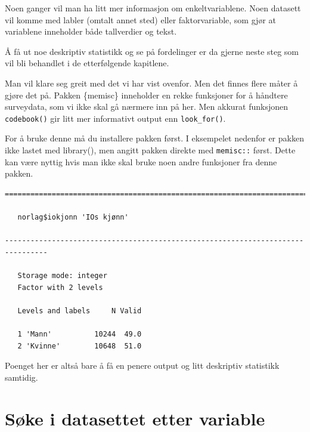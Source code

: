 \documentclass[
  letterpaper,
  DIV=11,
  numbers=noendperiod]{scrreprt}
\newenvironment{Shaded}{\begin{snugshade}}{\end{snugshade}}
\newcommand{\FunctionTok}[1]{\textcolor[rgb]{0.28,0.35,0.67}{#1}}
\newcommand{\NormalTok}[1]{\textcolor[rgb]{0.00,0.23,0.31}{#1}}
\newcommand{\SpecialCharTok}[1]{\textcolor[rgb]{0.37,0.37,0.37}{#1}}
\theoremstyle{definition}
\theoremstyle{remark}
\begin{document}
Noen ganger vil man ha litt mer informasjon om enkeltvariablene. Noen
datasett vil komme med labler (omtalt annet sted) eller faktorvariable,
som gjør at variablene inneholder både tallverdier og tekst.

Å få ut noe deskriptiv statistikk og se på fordelinger er da gjerne
neste steg som vil bli behandlet i de etterfølgende kapitlene.

Man vil klare seg greit med det vi har vist ovenfor. Men det finnes
flere måter å gjøre det på. Pakken \{memisc\} inneholder en rekke
funksjoner for å håndtere surveydata, som vi ikke skal gå nærmere inn på
her. Men akkurat funksjonen \texttt{codebook()} gir litt mer informativt
output enn \texttt{look\_for()}.

For å bruke denne må du installere pakken først. I eksempelet nedenfor
er pakken ikke lastet med library(), men angitt pakken direkte med
\texttt{memisc::} først. Dette kan være nyttig hvis man ikke skal bruke
noen andre funksjoner fra denne pakken.

\begin{Shaded}
\end{Shaded}

\begin{verbatim}
================================================================================

   norlag$iokjonn 'IOs kjønn'

--------------------------------------------------------------------------------

   Storage mode: integer
   Factor with 2 levels

   Levels and labels     N Valid
                                
   1 'Mann'          10244  49.0
   2 'Kvinne'        10648  51.0
\end{verbatim}

Poenget her er altså bare å få en penere output og litt deskriptiv
statistikk samtidig.

\hypertarget{suxf8ke-i-datasettet-etter-variable}{%
\section{Søke i datasettet etter
variable}\label{suxf8ke-i-datasettet-etter-variable}}
\end{document}
